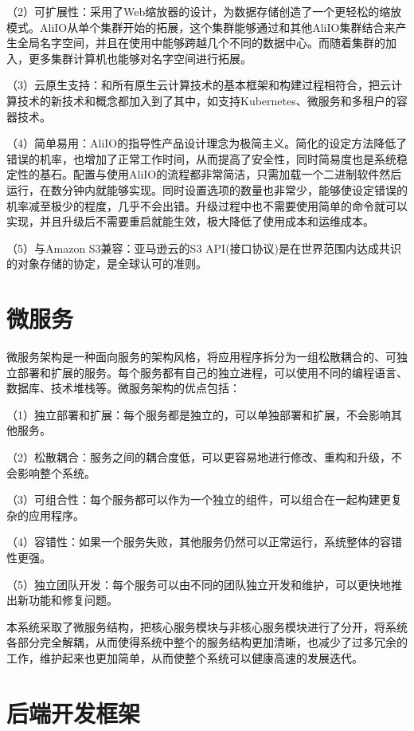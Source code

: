 （2）可扩展性：采用了Web缩放器的设计，为数据存储创造了一个更轻松的缩放模式。AliIO从单个集群开始的拓展，这个集群能够通过和其他AliIO集群结合来产生全局名字空间，并且在使用中能够跨越几个不同的数据中心。而随着集群的加入，更多集群计算机也能够对名字空间进行拓展。

（3）云原生支持：和所有原生云计算技术的基本框架和构建过程相符合，把云计算技术的新技术和概念都加入到了其中，如支持Kubernetes、微服务和多租户的容器技术。

（4）简单易用：AliIO的指导性产品设计理念为极简主义。简化的设定方法降低了错误的机率，也增加了正常工作时间，从而提高了安全性，同时简易度也是系统稳定性的基石。配置与使用AliIO的流程都非常简洁，只需加载一个二进制软件然后运行，在数分钟内就能够实现。同时设置选项的数量也非常少，能够使设定错误的机率减至极少的程度，几乎不会出错。升级过程中也不需要使用简单的命令就可以实现，并且升级后不需要重启就能生效，极大降低了使用成本和运维成本。

（5）与Amazon S3兼容：亚马逊云的S3 API(接口协议)是在世界范围内达成共识的对象存储的协定，是全球认可的准则。




\section{微服务}


微服务架构是一种面向服务的架构风格，将应用程序拆分为一组松散耦合的、可独立部署和扩展的服务。每个服务都有自己的独立进程，可以使用不同的编程语言、数据库、技术堆栈等。微服务架构的优点包括：

（1）独立部署和扩展：每个服务都是独立的，可以单独部署和扩展，不会影响其他服务。

（2）松散耦合：服务之间的耦合度低，可以更容易地进行修改、重构和升级，不会影响整个系统。

（3）可组合性：每个服务都可以作为一个独立的组件，可以组合在一起构建更复杂的应用程序。

（4）容错性：如果一个服务失败，其他服务仍然可以正常运行，系统整体的容错性更强。

（5）独立团队开发：每个服务可以由不同的团队独立开发和维护，可以更快地推出新功能和修复问题。

本系统采取了微服务结构，把核心服务模块与非核心服务模块进行了分开，将系统各部分完全解耦，从而使得系统中整个的服务结构更加清晰，也减少了过多冗余的工作，维护起来也更加简单，从而使整个系统可以健康高速的发展迭代。

\section{后端开发框架}

